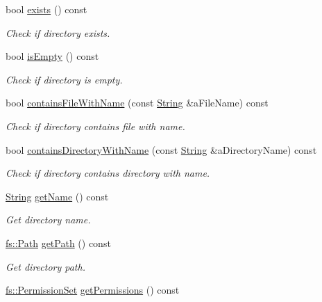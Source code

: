 \begin{DoxyCompactItemize}
bool \hyperlink{classostk_1_1core_1_1fs_1_1_directory_a05eba0f3f165b8e50ae89fd26b07776c}{exists} () const
\begin{DoxyCompactList}\small\item\em Check if directory exists. \end{DoxyCompactList}\item 
bool \hyperlink{classostk_1_1core_1_1fs_1_1_directory_a736757a78940be56153379e8b8305841}{is\+Empty} () const
\begin{DoxyCompactList}\small\item\em Check if directory is empty. \end{DoxyCompactList}\item 
bool \hyperlink{classostk_1_1core_1_1fs_1_1_directory_ada98ea55cb05fb3297bb318420caed67}{contains\+File\+With\+Name} (const \hyperlink{classostk_1_1core_1_1types_1_1_string}{String} \&a\+File\+Name) const
\begin{DoxyCompactList}\small\item\em Check if directory contains file with name. \end{DoxyCompactList}\item 
bool \hyperlink{classostk_1_1core_1_1fs_1_1_directory_aac35798f8765060ddd76cfdcce5d312b}{contains\+Directory\+With\+Name} (const \hyperlink{classostk_1_1core_1_1types_1_1_string}{String} \&a\+Directory\+Name) const
\begin{DoxyCompactList}\small\item\em Check if directory contains directory with name. \end{DoxyCompactList}\item 
\hyperlink{classostk_1_1core_1_1types_1_1_string}{String} \hyperlink{classostk_1_1core_1_1fs_1_1_directory_a0818daac289a2ebe5bd0c3db6edec77b}{get\+Name} () const
\begin{DoxyCompactList}\small\item\em Get directory name. \end{DoxyCompactList}\item 
\hyperlink{classostk_1_1core_1_1fs_1_1_path}{fs\+::\+Path} \hyperlink{classostk_1_1core_1_1fs_1_1_directory_adc130a2677b99fd23e1f816db521f857}{get\+Path} () const
\begin{DoxyCompactList}\small\item\em Get directory path. \end{DoxyCompactList}\item 
\hyperlink{classostk_1_1core_1_1fs_1_1_permission_set}{fs\+::\+Permission\+Set} \hyperlink{classostk_1_1core_1_1fs_1_1_directory_a2a566a9e0ecf33f6903b51678ecb5999}{get\+Permissions} () const

\end{DoxyCompactItemize}
